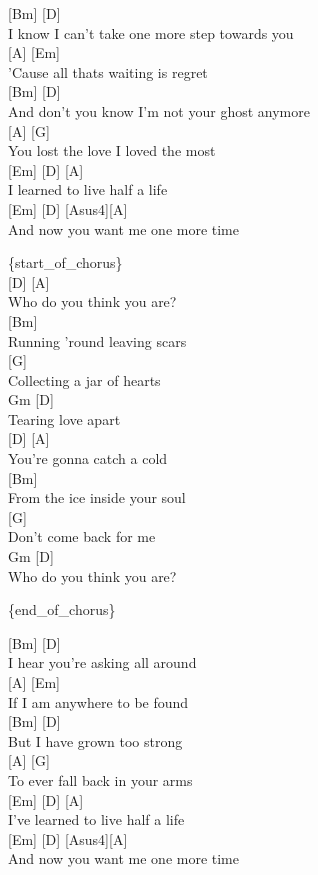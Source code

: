 \documentclass[
  letterpaper,
  DIV=11,
  numbers=noendperiod]{scrreprt}
\begin{document}
{[}Bm{]} {[}D{]}\\
I know I can't take one more step towards you\\
{[}A{]} {[}Em{]}\\
'Cause all thats waiting is regret\\
{[}Bm{]} {[}D{]}\\
And don't you know I'm not your ghost anymore\\
{[}A{]} {[}G{]}\\
You lost the love I loved the most\\
{[}Em{]} {[}D{]} {[}A{]}\\
I learned to live half a life\\
{[}Em{]} {[}D{]} {[}Asus4{]}{[}A{]}\\
And now you want me one more time

\{start\_of\_chorus\}\\
{[}D{]} {[}A{]}\\
Who do you think you are?\\
{[}Bm{]}\\
Running 'round leaving scars\\
{[}G{]}\\
Collecting a jar of hearts\\
Gm {[}D{]}\\
Tearing love apart\\
{[}D{]} {[}A{]}\\
You're gonna catch a cold\\
{[}Bm{]}\\
From the ice inside your soul\\
{[}G{]}\\
Don't come back for me\\
Gm {[}D{]}\\
Who do you think you are?

\{end\_of\_chorus\}

{[}Bm{]} {[}D{]}\\
I hear you're asking all around\\
{[}A{]} {[}Em{]}\\
If I am anywhere to be found\\
{[}Bm{]} {[}D{]}\\
But I have grown too strong\\
{[}A{]} {[}G{]}\\
To ever fall back in your arms\\
{[}Em{]} {[}D{]} {[}A{]}\\
I've learned to live half a life\\
{[}Em{]} {[}D{]} {[}Asus4{]}{[}A{]}\\
And now you want me one more time
\end{document}
